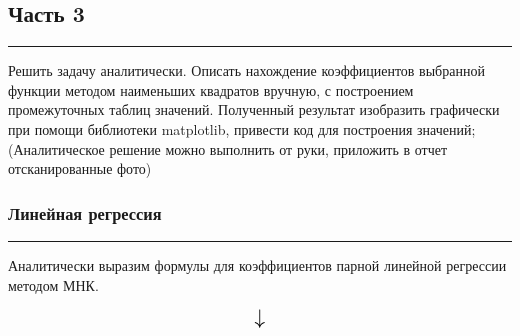 \documentclass[a4paper, 14pt]{extarticle}
\begin{document}
\subsection*{{Часть 3}}\vspace{-20pt}\rule{\linewidth}{0.1mm}

Решить задачу аналитически. Описать нахождение коэффициентов выбранной функции методом 
наименьших квадратов вручную, с построением промежуточных таблиц значений. Полученный 
результат изобразить графически при помощи библиотеки matplotlib, привести код для построения 
значений; (Аналитическое решение можно выполнить от руки, приложить в отчет отсканированные фото)

\subsubsection*{{Линейная регрессия}}\vspace{-20pt}\rule{\linewidth}{0.1mm}

Аналитически выразим формулы для коэффициентов парной линейной регрессии методом МНК.

\vfill

\begin{equation*}
    \scalebox{1.5}{
        $\downarrow$
    }
\end{equation*}

\vfill\newpage

\begin{center}
     \\
\end{center}

\begin{center}
     \\
\end{center}

\begin{center}
     \\
\end{center}
\end{document}
